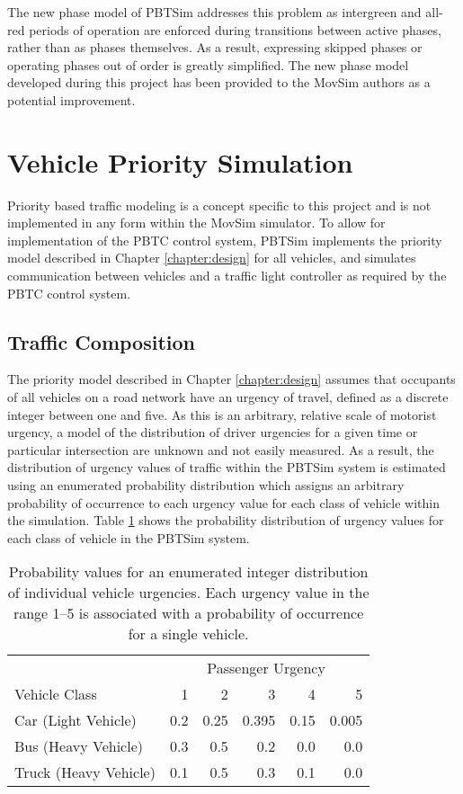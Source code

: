 The new phase model of PBTSim addresses this problem as intergreen and all-red periods of operation are enforced during transitions between active phases, rather than as phases themselves. As a result, expressing skipped phases or operating phases out of order is greatly simplified. The new phase model developed during this project has been provided to the MovSim authors as a potential improvement.


\section{Vehicle Priority Simulation}

Priority based traffic modeling is a concept specific to this project and is not implemented in any form within the MovSim simulator. To allow for implementation of the PBTC control system, PBTSim implements the priority model described in Chapter \ref{chapter:design} for all vehicles, and simulates communication between vehicles and a traffic light controller as required by the PBTC control system.

\subsection{Traffic Composition}

The priority model described in Chapter \ref{chapter:design} assumes that occupants of all vehicles on a road network have an urgency of travel, defined as a discrete integer between one and five. As this is an arbitrary, relative scale of motorist urgency, a model of the distribution of driver urgencies for a given time or particular intersection are unknown and not easily measured. As a result, the distribution of urgency values of traffic within the PBTSim system is estimated using an enumerated probability distribution which assigns an arbitrary probability of occurrence to each urgency value for each class of vehicle within the simulation. Table \ref{urgencydistribution} shows the probability distribution of urgency values for each class of vehicle in the PBTSim system. 

\begin{table}[]
\begin{center}
\begin{tabular}{lrrrrr}
\toprule
 & \multicolumn{5}{c}{Passenger Urgency} \\
 \cmidrule(lr){2-6}
Vehicle Class & 1 & 2 & 3 & 4 & 5 \\
\midrule
Car (Light Vehicle) & 0.2 & 0.25 & 0.395 & 0.15 & 0.005  \\
Bus (Heavy Vehicle) & 0.3 & 0.5 & 0.2 & 0.0 & 0.0 \\
Truck (Heavy Vehicle) & 0.1 & 0.5 & 0.3 & 0.1 & 0.0 \\
\bottomrule
\end{tabular}
\end{center}
\caption{Probability values for an enumerated integer distribution of individual vehicle urgencies. Each urgency value in the range 1--5 is associated with a probability of occurrence for a single vehicle. }
	\label{urgencydistribution}
\end{table}

